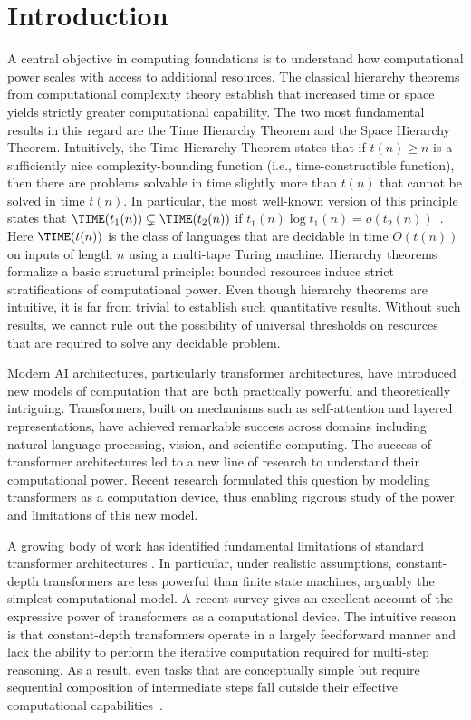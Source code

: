 \section{Introduction}

A central objective in computing foundations is to understand how computational power scales with access to additional resources. The classical hierarchy theorems from computational complexity theory establish that increased time or space yields strictly greater computational capability. The two most fundamental results in this regard are the Time Hierarchy Theorem and the Space Hierarchy Theorem. Intuitively, the Time Hierarchy Theorem states that if $t(n) \geq n$ is a sufficiently nice complexity-bounding function (i.e., time-constructible function), then there are problems solvable in time slightly more than $t(n)$ that cannot be solved in time $t(n)$. In particular, the most well-known version of this principle states that 
$\TIME(t_1(n)) \subsetneq \TIME(t_2(n))$
if $t_1(n)\log t_1(n) = o(t_2(n))$~\cite{hartmanis1965computational}.
Here $\TIME(t(n))$ is the class of languages that are decidable in time $O(t(n))$ on inputs of length $n$ using a multi-tape Turing machine. Hierarchy theorems 
formalize a basic structural principle: bounded resources induce strict stratifications of computational power. Even though hierarchy theorems are intuitive, it is far from trivial to establish such quantitative results. Without such results, we cannot rule out the possibility of universal thresholds on resources that are required to solve any decidable problem.  

Modern AI architectures, particularly transformer architectures, have introduced new models of computation that are both practically powerful and theoretically intriguing. Transformers, built on mechanisms such as self-attention and layered representations, have achieved remarkable success across domains including natural language processing, vision, and scientific computing. The success of transformer architectures led to 
a new line of research to understand their computational power. Recent research formulated this question by modeling transformers as a computation device, thus enabling rigorous study of the power and limitations of this new model. 

A growing body of work  has identified fundamental limitations of standard transformer architectures \cite{hahn2020theoretical,chiang2023tighter,liu2023transformers_shortcuts,hao2022formal,merrill2022saturated,merrill2023expressive,merrill2023parallelism}. In particular, under realistic assumptions, constant-depth transformers are less powerful than finite state machines, arguably the simplest computational model. A recent survey \cite{Strobl_2024} gives an excellent account of the expressive power of transformers as a computational device. The intuitive reason is that constant-depth transformers operate in a largely feedforward manner and lack the ability to perform the iterative computation required for multi-step reasoning. As a result, even tasks that are conceptually simple but require sequential composition of intermediate steps fall outside their effective computational capabilities~\cite{PengNarayananPapadimitriou2024,DziriLSLJLWWB0H23,ZhangPMLS24}. 


